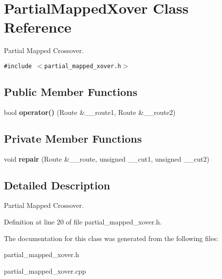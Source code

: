 \section{PartialMappedXover Class Reference}
\label{class_partial_mapped_xover}
Partial Mapped Crossover.  


{\tt \#include $<$partial\_\-mapped\_\-xover.h$>$}

\subsection*{Public Member Functions}
\begin{CompactItemize}
\item 
bool {\bf operator()} (Route \&\_\-\_\-route1, Route \&\_\-\_\-route2)\label{class_partial_mapped_xover_1cda6ea86ca36e5de0125f4ba5cfc695}

\end{CompactItemize}
\subsection*{Private Member Functions}
\begin{CompactItemize}
\item 
void {\bf repair} (Route \&\_\-\_\-route, unsigned \_\-\_\-cut1, unsigned \_\-\_\-cut2)\label{class_partial_mapped_xover_b6d4035544aff3b2b3fe4b0eeea185a2}

\end{CompactItemize}


\subsection{Detailed Description}
Partial Mapped Crossover. 



Definition at line 20 of file partial\_\-mapped\_\-xover.h.

The documentation for this class was generated from the following files:\begin{CompactItemize}
\item 
partial\_\-mapped\_\-xover.h\item 
partial\_\-mapped\_\-xover.cpp\end{CompactItemize}
